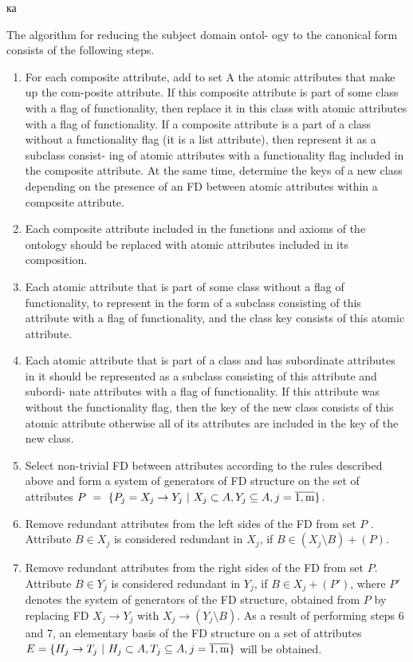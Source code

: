 ка\documentclass[times]{article}
\begin{document}
The algorithm for reducing the subject domain ontol- ogy to the canonical form consists of the following steps.
\begin{enumerate}[1{)}]
    \setlength{\itemsep}{1pt}
    \setlength{\parskip}{0pt}
    \item For each composite attribute, add to set A the atomic attributes that make up the com-posite attribute. If this composite attribute is part of some class with a flag of functionality, then replace it in this class with atomic attributes with a flag of functionality. If a composite attribute is a part of a class without a functionality flag (it is a list attribute), then represent it as a subclass consist- ing of atomic attributes with a functionality flag included in the composite attribute. At the same time, determine the keys of a new class depending on the presence of an FD between atomic attributes
within a composite attribute.
    \item Each composite attribute included in the functions
and axioms of the ontology should be replaced
with atomic attributes included in its composition.
    \item Each atomic attribute that is part of some class without a flag of functionality, to represent in the form of a subclass consisting of this attribute with a flag of functionality, and the class key consists
of this atomic attribute.
    \item Each atomic attribute that is part of a class and has
subordinate attributes in it should be represented as a subclass consisting of this attribute and subordi- nate attributes with a flag of functionality. If this attribute was without the functionality flag, then the key of the new class consists of this atomic attribute otherwise all of its attributes are included in the key of the new class.
    \item Select non-trivial FD between attributes according
to the rules described above and form a system of
generators of FD structure on the set of attributes
$P \ = \ \{P_{j} = X_{j} \to Y_{j} \ | \ X_{j} \subset A, Y_{j} \subseteq A, j = \overline{\rm 1,m} \}$.
    \item Remove redundant attributes from the left sides of
the FD from set $P$ . Attribute $B \in X_{j}$ is considered redundant in $X_{j}$, if $B \in (X_{j} \setminus B)+(P)$.
    \item Remove redundant attributes from the right sides of the FD from set $P$. Attribute $B \in Y_{j}$ is considered redundant in $Y_{j}$, if $B \in X_{j} + (P')$, where $P'$ denotes the system of generators of the FD structure, obtained from $P$ by replacing FD $X_{j} \to Y_{j}$ with $X_{j} \to (Y_{j} \setminus B)$. As a result of performing steps 6 and 7, an elementary basis of the FD structure on a set of attributes $E = \{H_{j} \to T_{j} \ | \ H_{j} \subset A,T_{j} \subseteq A,j = \overline{\rm 1, m} \}$ will be obtained.

\end{enumerate}
\end{document}
